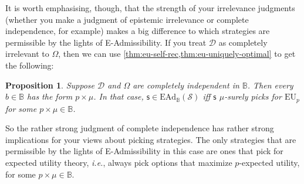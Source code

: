 \documentclass[a4paper]{article}
\newtheorem{proposition}[theorem]{Proposition}
\newcommand\D{\mathcal{D}}
\renewcommand\S{\mathcal{S}}
\newcommand\s{\mathsf{s}}
\newcommand\EU{\mathrm{EU}}
\newcommand\EAd{\mathrm{EAd}}
\newcommand{\IB}{\mathbb{B}}
\newcommand{\pb}{b}
\renewcommand{\color}[1]{}
\newcommand{\Strategies}{\mathcal{S}}
\newenvironment{CCM rewritten}
{\begingroup\color{blue}} %
{\endgroup}              %
\begin{document}
{\color{red} It is worth emphasising, though, that the strength of your irrelevance judgments (whether you make a judgment of epistemic irrelevance or complete independence, for example) makes a big difference to which strategies are permissible by the lights of E-Admissibility. If you treat $\D$ as completely irrelevant to $\Omega$, then we can use \cref{thm:eu-self-rec,thm:eu-uniquely-optimal} to get the following: 

\begin{proposition}\label{thm:ead-equiv[indep]} Suppose $\D$ and $\Omega$ are completely independent in $\IB$. Then every $\pb\in\IB$ has the form $p\times\mu$. In that case, $\s\in\EAd_\IB(\Strategies)$ iff $\s$ $\mu$-surely picks for $\EU_p$ for some $p\times \mu\in\IB$. 
\end{proposition}

So the rather strong judgment of complete independence has rather strong implications for your views about picking strategies. The only strategies that are permissible by the lights of E-Admissibility in this case are ones that pick for expected utility theory, \textit{i.e.}, always pick options that maximize $p$-expected utility, for some $p\times \mu\in\IB$.}


\begin{comment}
{\color{violet}
In fact, these are pretty much the only strategies that are permissible by the lights of E-Admissibility when coupled with $\IB$. Immediate from the definition of E-Admissibility, we have that a strategy is in $\EAd_\IB(\S)$ just if it is in $\EU_B(\S)$ for some $B\in\IB$. We can thus make use of \cref{thm:eu-self-rec,thm:eu-uniquely-optimal} to get the following, which applies when we have a strong independence. (In \cref{sect:EAd-dep} we will describe how this assumption can be dropped, but we first analyse it under this assumption.) 

\begin{proposition}\label{thm:ead-equiv[indep]}Suppose every $\pb\in\IB$ has the form $p\times\mu$.
	
	Then, $\s\in\EAd_\IB(\Strategies)$ iff $\s$ $\mu$-surely picks for $\EU_p$ for some $p\times \mu\in\IB$. 
\end{proposition}}
\end{comment}
\end{document}
